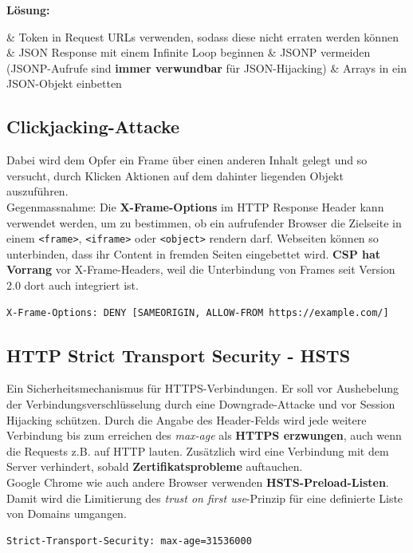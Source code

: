 \textbf{Lösung:}
\begin{easylist}
	& Token in Request URLs verwenden, sodass diese nicht erraten werden können
	& JSON Response mit einem Infinite Loop beginnen
	& JSONP vermeiden (JSONP-Aufrufe sind \textbf{immer verwundbar} für JSON-Hijacking)
	& Arrays in ein JSON-Objekt einbetten
\end{easylist}

\subsection{Clickjacking-Attacke}
Dabei wird dem Opfer ein Frame über einen anderen Inhalt gelegt und so versucht, durch Klicken Aktionen auf dem dahinter liegenden Objekt auszuführen.\\
Gegenmassnahme: Die \textbf{X-Frame-Options} im HTTP Response Header kann verwendet werden, um zu bestimmen, ob ein aufrufender Browser die Zielseite in einem \lstinline|<frame>|, \lstinline|<iframe>| oder \lstinline|<object>| rendern darf. Webseiten können so unterbinden, dass ihr Content in fremden Seiten eingebettet wird.
\textbf{CSP hat Vorrang} vor X-Frame-Headers, weil die Unterbindung von Frames seit Version 2.0 dort auch integriert ist.

\begin{lstlisting}[caption=Clickjacking mittels X-Frame-Options unterbinden, language={}]
X-Frame-Options: DENY [SAMEORIGIN, ALLOW-FROM https://example.com/]
\end{lstlisting}

\subsection{HTTP Strict Transport Security - HSTS}
Ein Sicherheitsmechanismus für HTTPS-Verbindungen. Er soll vor Aushebelung der Verbindungsverschlüsselung durch eine Downgrade-Attacke und vor Session Hijacking schützen. Durch die Angabe des Header-Felds wird jede weitere Verbindung bis zum erreichen des \textit{max-age} als \textbf{HTTPS erzwungen}, auch wenn die Requests z.B. auf HTTP lauten. Zusätzlich wird eine Verbindung mit dem Server verhindert, sobald \textbf{Zertifikatsprobleme} auftauchen.\\

Google Chrome wie auch andere Browser verwenden \textbf{HSTS-Preload-Listen}. Damit wird die Limitierung des \textit{trust on first use}-Prinzip für eine definierte Liste von Domains umgangen.

\begin{lstlisting}[language={},caption=HSTS-Header]
Strict-Transport-Security: max-age=31536000
\end{lstlisting}

